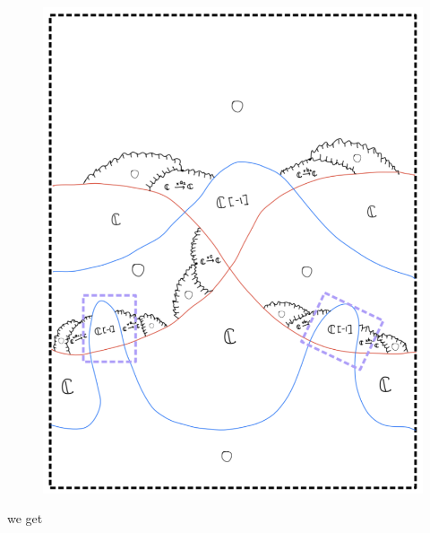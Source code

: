 \begin{enumerate}[label = (\roman*)]
\begin{enumerate}[label = (Step \arabic*)]
\begin{figure}[H]
    \includegraphics[scale = 0.95]{diagrams/cobord_gen/base_2.png}
    \caption{}
    \label{fig:your-label}
\end{figure}
\pagebreak
we get
\begin{figure}[H]
    \centering

\end{figure}
\end{enumerate}
\end{enumerate}
